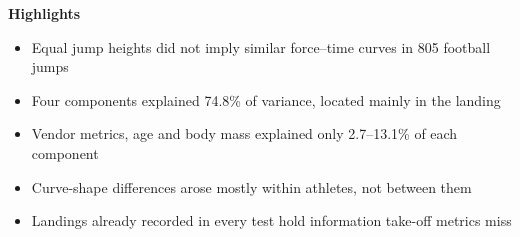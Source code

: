\documentclass[12pt,a4paper]{article}
\begin{document}
\noindent\textbf{Highlights}
\begin{itemize}
\item Equal jump heights did not imply similar force--time curves in 805 football jumps
\item Four components explained 74.8\% of variance, located mainly in the landing
\item Vendor metrics, age and body mass explained only 2.7--13.1\% of each component
\item Curve-shape differences arose mostly within athletes, not between them
\item Landings already recorded in every test hold information take-off metrics miss
\end{itemize}
\end{document}
